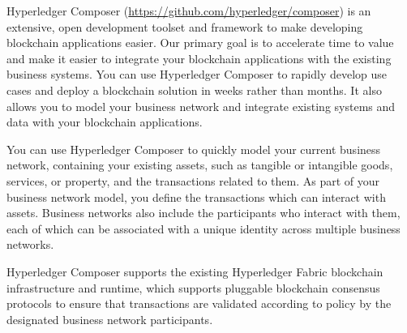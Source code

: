 Hyperledger Composer (\url{https://github.com/hyperledger/composer}) is an extensive, open development toolset and framework to make developing blockchain applications easier. Our primary goal is to accelerate time to value and make it easier to integrate your blockchain applications with the existing business systems. You can use Hyperledger Composer to rapidly develop use cases and deploy a blockchain solution in weeks rather than months. It also allows you to model your business network and integrate existing systems and data with your blockchain applications.

You can use Hyperledger Composer to quickly model your current business network, containing your existing assets, such as tangible or intangible goods, services, or property, and the transactions related to them. As part of your business network model, you define the transactions which can interact with assets. Business networks also include the participants who interact with them, each of which can be associated with a unique identity across multiple business networks.

Hyperledger Composer supports the existing Hyperledger Fabric blockchain infrastructure and runtime, which supports pluggable blockchain consensus protocols to ensure that transactions are validated according to policy by the designated business network participants.

